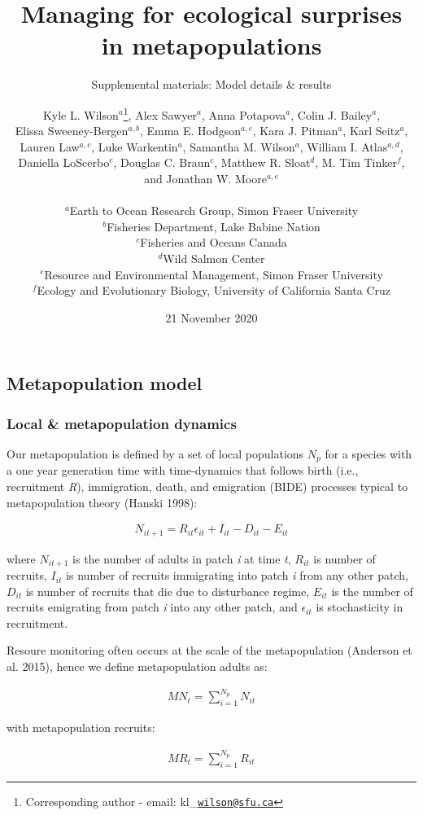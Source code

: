 \documentclass[
]{article}
\title{Managing for ecological surprises in metapopulations}
\subtitle{Supplemental materials: Model details \& results}
\author{Kyle L. Wilson\(^a\)\footnote{Corresponding author - email:
  kl\_\href{mailto:wilson@sfu.ca}{\nolinkurl{wilson@sfu.ca}}}, Alex
Sawyer\(^a\), Anna Potapova\(^a\), Colin J. Bailey\(^a\),\\
Elissa Sweeney-Bergen\(^{a,b}\), Emma E. Hodgson\(^{a,c}\), Kara J.
Pitman\(^a\), Karl Seitz\(^a\),\\
Lauren Law\(^{a,c}\), Luke Warkentin\(^a\), Samantha M. Wilson\(^a\),
William I. Atlas\(^{a,d}\),\\
Daniella LoScerbo\(^e\), Douglas C. Braun\(^c\), Matthew R. Sloat\(^d\),
M. Tim Tinker\(^f\),\\
and Jonathan W. Moore\(^{a,e}\)\\
~\\
\(^a\)Earth to Ocean Research Group, Simon Fraser University\\
\(^b\)Fisheries Department, Lake Babine Nation\\
\(^c\)Fisheries and Oceans Canada\\
\(^d\)Wild Salmon Center\\
\(^e\)Resource and Environmental Management, Simon Fraser University\\
\(^f\)Ecology and Evolutionary Biology, University of California Santa
Cruz}
\date{21 November 2020}
\begin{document}
\maketitle

\centering
\raggedright
\tableofcontents
\newpage

\pagestyle{fancy}

\hypertarget{metapopulation-model}{%
\subsection{Metapopulation model}\label{metapopulation-model}}

\hypertarget{local-metapopulation-dynamics}{%
\subsubsection{Local \& metapopulation
dynamics}\label{local-metapopulation-dynamics}}

Our metapopulation is defined by a set of local populations \(N_p\) for
a species with a one year generation time with time-dynamics that
follows birth (i.e., recruitment \emph{R}), immigration, death, and
emigration (BIDE) processes typical to metapopulation theory (Hanski
1998):

\begin{align}
N_{i{t+1}}= R_{it}\epsilon_{it}+I_{it}-D_{it}-E_{it}
\end{align}

where \(N_{it+1}\) is the number of adults in patch \emph{i} at time
\emph{t}, \(R_{it}\) is number of recruits, \(I_{it}\) is number of
recruits immigrating into patch \emph{i} from any other patch,
\(D_{it}\) is number of recruits that die due to disturbance regime,
\(E_{it}\) is the number of recruits emigrating from patch \emph{i} into
any other patch, and \(\epsilon_{it}\) is stochasticity in recruitment.

Resoure monitoring often occurs at the scale of the metapopulation
(Anderson et al. 2015), hence we define metapopulation adults as:

\begin{align}
{MN}_t = \sum_{i=1}^{N_p} N_{it}
\end{align}

with metapopulation recruits:

\begin{align}
MR_t = \sum_{i=1}^{N_p} R_{it}
\end{align}
\end{document}
